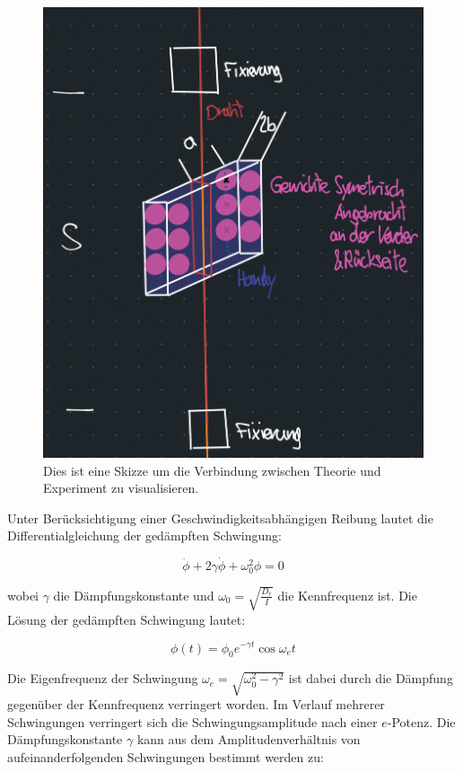 \documentclass[11pt,ngerman]{scrartcl}
\begin{document}
\begin{figure}[H]
    \centering
    \includegraphics[width=0.8\linewidth]{pics/Skizze.png}
    \caption{Dies ist eine Skizze um die Verbindung zwischen 
    Theorie und Experiment zu visualisieren.}%
    \label{fig:Skizze}
\end{figure}

Unter Berücksichtigung einer Geschwindigkeitsabhängigen Reibung lautet die
Differentialgleichung der gedämpften Schwingung:

\begin{equation}
    \ddot \phi + 2\gamma \dot \phi + \omega_{0}^{2} \phi = 0
\end{equation}

wobei $\gamma$ die Dämpfungskonstante und $\omega_0 = \sqrt{\frac{D_r}{I}}$
die Kennfrequenz ist. Die Lösung der
gedämpften Schwingung lautet:

\begin{equation}
    \phi(t) = \phi_0 e^{-\gamma t} \cos{\omega_e t}
\end{equation}

Die Eigenfrequenz der Schwingung $\omega_e = \sqrt{\omega_{0}^{2} - \gamma^2}$
ist dabei durch die Dämpfung gegenüber der Kennfrequenz verringert worden. Im
Verlauf mehrerer Schwingungen verringert sich die Schwingungsamplitude nach
einer $e$-Potenz. Die Dämpfungskonstante $\gamma$ kann aus dem
Amplitudenverhältnis von aufeinanderfolgenden Schwingungen bestimmt werden zu:
\end{document}
